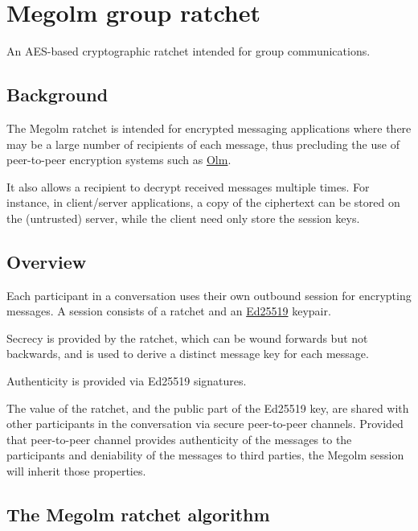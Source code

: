\documentclass[10pt]{article}
\begin{document}
\section{Megolm group ratchet}\label{megolm-group-ratchet}

An AES-based cryptographic ratchet intended for group communications.

\subsection{Background}\label{background}

The Megolm ratchet is intended for encrypted messaging applications
where there may be a large number of recipients of each message, thus
precluding the use of peer-to-peer encryption systems such as
\href{https://gitlab.matrix.org/matrix-org/olm/blob/master/docs/olm.md}{Olm}.

It also allows a recipient to decrypt received messages multiple times.
For instance, in client/server applications, a copy of the ciphertext
can be stored on the (untrusted) server, while the client need only
store the session keys.

\subsection{Overview}\label{overview}

Each participant in a conversation uses their own outbound session for
encrypting messages. A session consists of a ratchet and an
\href{http://ed25519.cr.yp.to/}{Ed25519} keypair.

Secrecy is provided by the ratchet, which can be wound forwards but not
backwards, and is used to derive a distinct message key for each
message.

Authenticity is provided via Ed25519 signatures.

The value of the ratchet, and the public part of the Ed25519 key, are
shared with other participants in the conversation via secure
peer-to-peer channels. Provided that peer-to-peer channel provides
authenticity of the messages to the participants and deniability of the
messages to third parties, the Megolm session will inherit those
properties.

\subsection{The Megolm ratchet
algorithm}\label{the-megolm-ratchet-algorithm}
\end{document}
